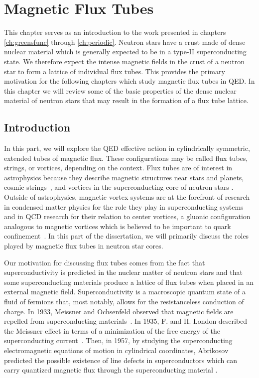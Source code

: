 \chapter{Magnetic Flux Tubes}
\label{ch:fluxtubes}
\acresetall


\begin{summary}
This chapter serves as an introduction to the work presented in chapters 
\ref{ch:greensfunc} through \ref{ch:periodic}.  Neutron stars have a crust made 
of dense nuclear material which is generally expected to be in a type-II superconducting state. 
We therefore expect the intense magnetic fields in the crust of a neutron star 
to form a lattice of individual flux tubes. This provides the primary motivation for the 
following chapters which study magnetic flux tubes in \ac{QED}. In this chapter we will 
review some of the basic properties of the dense nuclear material of neutron stars that 
may result in the formation of a flux tube lattice.
\end{summary}



\section{Introduction}
In this part, we will explore the \ac{QED} effective action 
in cylindrically symmetric, extended tubes of magnetic flux.
These configurations may be called 
flux tubes, strings, or vortices, depending on the context.  
Flux tubes are of interest in astrophysics 
because they describe magnetic structures near stars and planets, 
cosmic strings~\cite{vilenkin2000cosmic}, and vortices in the superconducting core of neutron stars
\cite{2006pfsb.book..135S, schmitt2010dense}.
Outside of astrophysics, magnetic vortex systems are at the forefront of research in condensed 
matter physics for the role they play in superconducting systems and in \ac{QCD} research 
for their relation to center vortices, a gluonic configuration analogous to magnetic vortices 
which is believed to be important to quark confinement~\cite{tHooft19781, 2003PrPNP..51....1G}.  
In this part of the dissertation, we will primarily discuss the 
roles played by magnetic flux tubes in neutron star cores. 

Our motivation for discussing flux tubes comes from the fact that 
superconductivity is predicted in the nuclear matter of neutron stars
and that some superconducting materials produce a lattice of flux tubes 
when placed in an external magnetic field. Superconductivity is a macroscopic 
quantum state of a fluid of fermions that, most notably,
allows for the resistanceless conduction of charge. In 1933, 
Meissner and Ochsenfeld observed that magnetic fields are repelled 
from superconducting materials~\cite{meisner33}. 
In 1935, F. and H. London described the Meissner effect in terms of 
a minimization of the free energy of the superconducting current~\cite{london35}.
Then, in 1957, by studying the superconducting 
electromagnetic equations of motion in cylindrical coordinates, 
Abrikosov predicted the possible existence of line defects in superconductors 
which can carry quantized magnetic flux through the superconducting material
\cite{abrikosov57}. 

